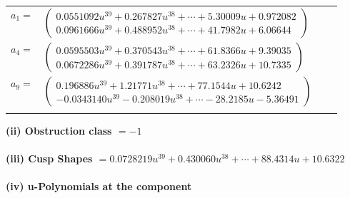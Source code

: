 \documentclass[1p]{elsarticle_modified}
\theoremstyle{definition}
\begin{document}
\begin{tabular}{m{7pt} m{180pt} m{7pt} m{180pt} }
\flushright $a_{1}=$&$\begin{pmatrix}0.0551092 u^{39}+0.267827 u^{38}+\cdots+5.30009 u+0.972082\\0.0961666 u^{39}+0.488952 u^{38}+\cdots+41.7982 u+6.06644\end{pmatrix}$ \\
\flushright $a_{4}=$&$\begin{pmatrix}0.0595503 u^{39}+0.370543 u^{38}+\cdots+61.8366 u+9.39035\\0.0672286 u^{39}+0.391787 u^{38}+\cdots+63.2326 u+10.7335\end{pmatrix}$ \\
\flushright $a_{9}=$&$\begin{pmatrix}0.196886 u^{39}+1.21771 u^{38}+\cdots+77.1544 u+10.6242\\-0.0343140 u^{39}-0.208019 u^{38}+\cdots-28.2185 u-5.36491\end{pmatrix}$\\&\end{tabular}
\flushleft \textbf{(ii) Obstruction class $= -1$}\\~\\
\flushleft \textbf{(iii) Cusp Shapes $= 0.0728219 u^{39}+0.430060 u^{38}+\cdots+88.4314 u+10.6322$}\\~\\
\newpage\renewcommand{\arraystretch}{1}
\flushleft \textbf{(iv) u-Polynomials at the component}\newline \\
\end{document}

